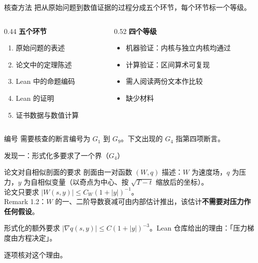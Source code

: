 \documentclass[aspectratio=169,11pt,fontset=windows]{ctexbeamer}
\newcommand{\abs}[1]{\left\lvert #1\right\rvert}
\begin{document}
\begin{frame}{核查方法}
  \small
  把从原始问题到数值证据的过程分成五个环节，每个环节标一个等级。

  \vspace{2mm}
  \begin{columns}[T]
    \begin{column}{0.44\textwidth}
      \textbf{五个环节}
      \footnotesize
      \begin{enumerate}
        \setlength{\itemsep}{1pt}
        \item 原始问题的表述
        \item 论文中的定理陈述
        \item Lean 中的命题编码
        \item Lean 的证明
        \item 证书数据与数值计算
      \end{enumerate}
    \end{column}
    \begin{column}{0.52\textwidth}
      \textbf{四个等级}
      \footnotesize
      \begin{itemize}
        \setlength{\itemsep}{2pt}
        \item[$M$] 机器验证：内核与独立内核均通过
        \item[$C$] 计算验证：区间算术可复现
        \item[$R$] 需人阅读两份文本作比较
        \item[$N$] 缺少材料
      \end{itemize}
    \end{column}
  \end{columns}

  \vspace{3mm}
  \begin{block}{编号}
    \footnotesize
    需要核查的断言编号为 $G_1$ 到 $G_9$。下文出现的 $G_4$ 指第四项断言。
  \end{block}
\end{frame}

\begin{frame}{发现一：形式化多要求了一个界（$G_4$）}
  \small
  \begin{block}{论文对自相似剖面的要求}
    \footnotesize
    剖面由一对函数 $(W,q)$ 描述：$W$ 为速度场，$q$ 为压力，$y$ 为自相似变量（以奇点为中心、按 $\sqrt{T-t}$ 缩放后的坐标）。\\[1pt]
    论文只要求 $\abs{W(s,y)}\le C_W(1+\abs{y})^{-1}$。\\[1pt]
    Remark 1.2：$W$ 的一、二阶导数衰减可由内部估计推出，该估计\textbf{不需要对压力作任何假设}。
  \end{block}

  \begin{block}{形式化的额外要求}
    \footnotesize
    $\abs{\nabla q(s,y)}\le C(1+\abs{y})^{-3}$。\quad Lean 仓库给出的理由：「压力梯度由方程决定」。
  \end{block}

  \vspace{1mm}
  \centering
  \footnotesize
  逐项核对这个理由。
\end{frame}
\end{document}
